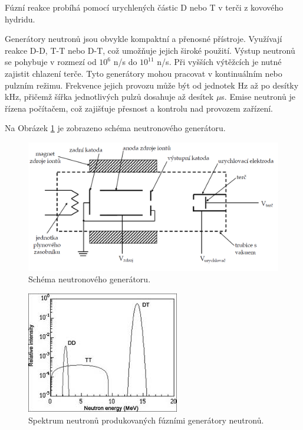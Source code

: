Fúzní reakce probíhá pomocí urychlených částic D nebo T v terči z kovového hydridu.

Generátory neutronů jsou obvykle kompaktní a přenosné přístroje. Využívají reakce D-D, T-T nebo D-T, což umožňuje jejich široké použití. Výstup neutronů se pohybuje v rozmezí od $10^6$ n/s do $10^{11}$ n/s. Při vyšších výtěžcích je nutné zajistit chlazení terče. Tyto generátory mohou pracovat v kontinuálním nebo pulzním režimu. Frekvence jejich provozu může být od jednotek Hz až po desítky kHz, přičemž šířka jednotlivých pulzů dosahuje až desítek $\mu$s. Emise neutronů je řízena počítačem, což zajišťuje přesnost a kontrolu nad provozem zařízení.

Na Obrázek \ref{fig:Schéma neutronového generátoru} je zobrazeno schéma neutronového generátoru.

\begin{figure}[H] 
    \centering
    \includegraphics[scale=0.49]{img/generator.png}
    \caption{Schéma neutronového generátoru.}
    \label{fig:Schéma neutronového generátoru}
\end{figure}

\begin{figure}[H] 
    \centering
    \includegraphics[scale=1.0]{img/SpektrumNeutronůZFůzníhoGenerátoru.jpg}
    \caption{Spektrum neutronů produkovaných fúzními generátory neutronů.}
    \label{fig:SpektrumNeutronůZFůzníhoGenerátoru}
\end{figure}


